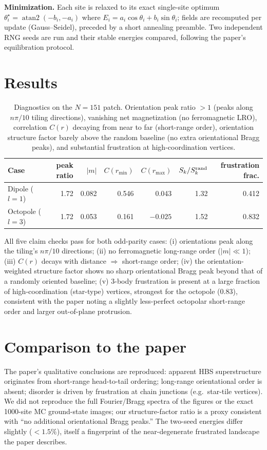 \documentclass[11pt]{article}
\begin{document}
\textbf{Minimization.} Each site is relaxed to its exact single-site optimum
$\theta_i^\star=\operatorname{atan2}(-b_i,-a_i)$ where
$E_i=a_i\cos\theta_i+b_i\sin\theta_i$; fields are recomputed per update
(Gauss--Seidel), preceded by a short annealing preamble. Two independent RNG
seeds are run and their stable energies compared, following the paper's
equilibration protocol.

\section{Results}
\begin{table}[h]\centering
\begin{tabular}{lrrrrrr}
\toprule
Case & peak ratio & $|m|$ & $C(r_{\min})$ & $C(r_{\max})$ & $S_k/S_k^{\rm rand}$ & frustration frac.\\
\midrule
Dipole ($l{=}1$)   & 1.72 & 0.082 & 0.546 & 0.043 & 1.32 & 0.412\\
Octopole ($l{=}3$) & 1.72 & 0.053 & 0.161 & $-0.025$ & 1.52 & 0.832\\
\bottomrule
\end{tabular}
\caption{Diagnostics on the $N{=}151$ patch. Orientation peak ratio $>1$
(peaks along $n\pi/10$ tiling directions), vanishing net magnetization (no
ferromagnetic LRO), correlation $C(r)$ decaying from near to far (short-range
order), orientation structure factor barely above the random baseline (no extra
orientational Bragg peaks), and substantial frustration at high-coordination
vertices.}
\end{table}

All five claim checks pass for both odd-parity cases:
(i) orientations peak along the tiling's $n\pi/10$ directions;
(ii) no ferromagnetic long-range order ($|m|\!\ll\!1$);
(iii) $C(r)$ decays with distance $\Rightarrow$ short-range order;
(iv) the orientation-weighted structure factor shows no sharp orientational
Bragg peak beyond that of a randomly oriented baseline;
(v) 3-body frustration is present at a large fraction of high-coordination
(star-type) vertices, strongest for the octopole ($0.83$), consistent with the
paper noting a slightly less-perfect octopolar short-range order and larger
out-of-plane protrusion.

\section{Comparison to the paper}
The paper's qualitative conclusions are reproduced: apparent HBS superstructure
originates from short-range head-to-tail ordering; long-range orientational order
is absent; disorder is driven by frustration at chain junctions (e.g.\ star-tile
vertices). We did not reproduce the full Fourier/Bragg spectra of the figures or
the exact 1000-site MC ground-state images; our structure-factor ratio is a
proxy consistent with ``no additional orientational Bragg peaks.'' The two-seed
energies differ slightly ($<1.5\%$), itself a fingerprint of the near-degenerate
frustrated landscape the paper describes.
\end{document}
